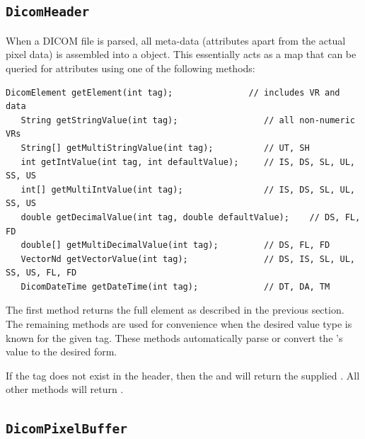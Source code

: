 \subsection{\texttt{DicomHeader}}

When a DICOM file is parsed, all meta-data (attributes apart from the actual pixel data) 
is assembled into a  object.  This essentially acts
as a map that can be queried for attributes using one of the following methods:
\begin{lstlisting}[]
   DicomElement getElement(int tag);               // includes VR and data
   String getStringValue(int tag);                 // all non-numeric VRs
   String[] getMultiStringValue(int tag);          // UT, SH
   int getIntValue(int tag, int defaultValue);     // IS, DS, SL, UL, SS, US
   int[] getMultiIntValue(int tag);                // IS, DS, SL, UL, SS, US
   double getDecimalValue(int tag, double defaultValue);    // DS, FL, FD
   double[] getMultiDecimalValue(int tag);         // DS, FL, FD
   VectorNd getVectorValue(int tag);               // DS, IS, SL, UL, SS, US, FL, FD
   DicomDateTime getDateTime(int tag);             // DT, DA, TM
\end{lstlisting}
The first method returns the full element as described in the previous section.  
The remaining methods are used for convenience when the desired value type is known for the given tag.  
These methods automatically parse or convert the 's value to the desired form.

If the tag does not exist in the header, then the  and
 will return the supplied .  All other methods
will return .

\subsection{\texttt{DicomPixelBuffer}}

